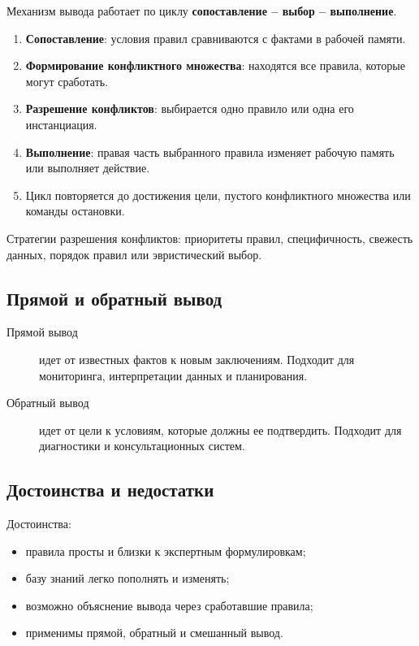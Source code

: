 Механизм вывода работает по циклу \textbf{сопоставление -- выбор -- выполнение}.

\begin{enumerate}
    \item \textbf{Сопоставление}: условия правил сравниваются с фактами в рабочей памяти.
    \item \textbf{Формирование конфликтного множества}: находятся все правила, которые могут сработать.
    \item \textbf{Разрешение конфликтов}: выбирается одно правило или одна его инстанциация.
    \item \textbf{Выполнение}: правая часть выбранного правила изменяет рабочую память или выполняет действие.
    \item Цикл повторяется до достижения цели, пустого конфликтного множества или команды остановки.
\end{enumerate}

Стратегии разрешения конфликтов: приоритеты правил, специфичность, свежесть данных, порядок правил или эвристический выбор.

\subsection*{Прямой и обратный вывод}

\begin{description}
    \item[Прямой вывод] идет от известных фактов к новым заключениям. Подходит для мониторинга, интерпретации данных и планирования.
    \item[Обратный вывод] идет от цели к условиям, которые должны ее подтвердить. Подходит для диагностики и консультационных систем.
\end{description}

\subsection*{Достоинства и недостатки}

Достоинства:
\begin{itemize}
    \item правила просты и близки к экспертным формулировкам;
    \item базу знаний легко пополнять и изменять;
    \item возможно объяснение вывода через сработавшие правила;
    \item применимы прямой, обратный и смешанный вывод.
\end{itemize}

